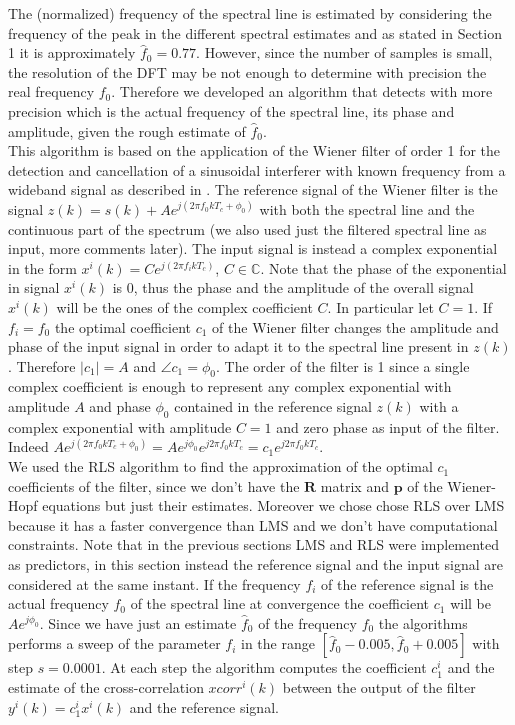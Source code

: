\documentclass[10pt]{article}
\numberwithin{equation}{section}
\begin{document}
The (normalized) frequency of the spectral line is estimated by considering the frequency of the peak in the different spectral estimates and as stated in Section 1 it is approximately $\hat{f}_0 = 0.77$. However, since the number of samples is small, the resolution of the DFT may be not enough to determine with precision the real frequency $f_0$. Therefore we developed an algorithm that detects with more precision which is the actual frequency of the spectral line, its phase and amplitude, given the rough estimate of $\hat{f}_0$. \\
This algorithm is based on the application of the Wiener filter of order 1 for the detection and cancellation of a sinusoidal interferer with known frequency from a wideband signal as described in \cite{bc}.
The reference signal of the Wiener filter is the signal $z(k) = s(k) + Ae^{j(2 \pi f_0 k T_c + \phi_0)}$ with both the spectral line and the continuous part of the spectrum (we also used just the filtered spectral line as input, more comments later). The input signal is instead a complex exponential in the form $x^i(k) = C e^{j (2 \pi f_i k T_c)}$, $C \in \mathbb{C}$. Note that the phase of the exponential in signal $x^i(k)$ is 0, thus the phase and the amplitude of the overall signal $x^i(k)$ will be the ones of the complex coefficient $C$. In particular let $C = 1$. If $f_i = f_0$ the optimal coefficient $c_1$ of the Wiener filter changes the amplitude and phase of the input signal in order to adapt it to the spectral line present in $z(k)$. Therefore $|c_1| = A$ and $\angle{c_1} = \phi_0$.  The order of the filter is 1 since a single complex coefficient is enough to represent any complex exponential with amplitude $A$ and phase $\phi_0$ contained in the reference signal $z(k)$ with a complex exponential with amplitude $C = 1$ and zero phase as input of the filter. Indeed $Ae^{j(2 \pi f_0 k T_c + \phi_0)} = Ae^{j\phi_0}e^{j2 \pi f_0 k T_c} = c_1 e^{j2 \pi f_0 k T_c}$.\\
We used the RLS algorithm to find the approximation of the optimal $c_1$ coefficients of the filter, since we don't have the $\mathbf{R}$ matrix and $\mathbf{p}$ of the Wiener-Hopf equations but just their estimates. Moreover we chose chose RLS over LMS because it has a faster convergence than LMS and we don't have computational constraints. Note that in the previous sections LMS and RLS were implemented as predictors, in this section instead the reference signal and the input signal are considered at the same instant. If the frequency $f_i$ of the reference signal is the actual frequency $f_0$ of the spectral line at convergence the coefficient $c_1$ will be $A e^{j\phi_0}$. Since we have just an estimate $\hat{f}_0$ of the frequency $f_0$ the algorithms performs a sweep of the parameter $f_i$ in the range $[\hat{f}_0 - 0.005, \hat{f}_0 + 0.005]$ with step $s = 0.0001$. At each step the algorithm computes the coefficient $c_1^i$ and the estimate of the cross-correlation $xcorr^i(k)$ between the output of the filter $y^i(k) = c_1^i x^i(k)$ and the reference signal.
\end{document}

